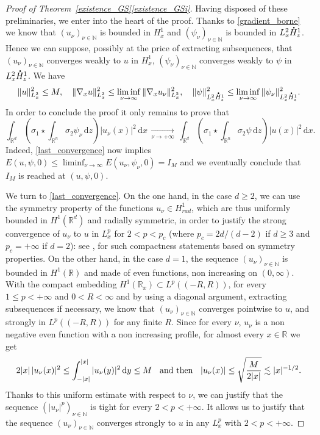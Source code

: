 \documentclass[10pt]{amsart}
\theoremstyle{definition}
\newcommand*{\overbigdot}[1]{%
\accentset{\mbox{\large\bfseries .}}{#1}}
\newenvironment{ProofOf}[1]{\begin{proof}[Proof of #1]}{\end{proof}}
\newcommand{\R}{\mathbb{R}}
\newcommand{\ud}{\, {\mathrm{d}}}
\begin{document}
\begin{ProofOf}{Theorem~\ref{existence_GS}\eqref{existence_GSi}}
Having disposed of these preliminaries, we enter into the heart of the proof. Thanks to \eqref{gradient_borne} we know that $(u_{\nu})_{\nu\in \mathbb N}$ is bounded in $H_{x}^{1}$ and $(\psi_{\nu})_{\nu\in \mathbb N}$ is bounded in $L_{x}^{2}\overbigdot{H}_{z}^{1}$. Hence we can suppose, possibly at the price of extracting subsequences, that $(u_{\nu})_{\nu\in \mathbb N}$ converges weakly to $u$ in $H_{x}^{1}$, $(\psi_{\nu})_{\nu\in \mathbb N}$ converges weakly to $\psi$ in $L_{x}^{2}\overbigdot{H}_{z}^{1}$. We have
\[
\|u\|_{L_{x}^{2}}^{2}\leq M,\quad \|\nabla_{x}u\|_{L_{x}^{2}}^{2}\leq\liminf_{\nu\to \infty}\|\nabla_{x}u_{\nu}\|_{L_{x}^{2}}^{2},\quad \|\psi\|_{L_{x}^{2}\overbigdot{H}_{z}^{1}}^{2}\leq\liminf_{\nu\to \infty}\|\psi_{\nu}\|_{L_{x}^{2}\overbigdot{H}_{z}^{1}}^{2}.
\]
In order to conclude the proof it only remains to prove that\vspace*{-3pt}
\begin{equation}\label{last_convergence}
\int_{\R^{d}}\left(\sigma_{1}\star\int_{\R^{n}}\sigma_{2}\psi_{\nu}\ud z\right)|u_{\nu}(x)|^{2}\ud x\,\underset{\nu\to +\infty}{\to}\,\int_{\R^{d}}\left(\sigma_{1}\star\int_{\R^{n}}\sigma_{2}\psi\ud z\right)|u(x)|^{2}\ud x.
\end{equation}
Indeed, \eqref{last_convergence} now implies $E(u,\psi,0)\leq\liminf_{\nu\to\infty} E(u_{\nu},\psi_{\nu},0)=I_{M}$ and we eventually conclude that $I_{M}$ is reached at $(u,\psi,0)$.

We turn to \eqref{last_convergence}. On the one hand, in the case $d\geq 2$,
we can use the symmetry property of the functions $u_{\nu}\in H_{rad}^{1}$,
which are thus uniformly bounded in $H^1(\mathbb R^d)$ and radially symmetric,
in order to justify the strong convergence of $u_{\nu}$ to $u$ in $L_{x}^{p}$ for $2<p<p_{c}$ (where $p_{c}=2d/(d-2)$ if $d\geq 3$ and $p_{c}=+\infty$ if $d=2$):
see \cite[Prop.\,1.1]{Pllsc}, \cite[Radial Lem.\,1]{Strauss} for such compactness statements based on symmetry properties. On the other hand, in the case $d=1$,
the sequence $(u_{\nu})_{\nu\in \mathbb N}$ is bounded in $H^1(\mathbb R)$
and made of even functions, non increasing on $(0,\infty)$.
With the compact embedding
$H^{1}(\R_{x})\subset L^{p}((-R,R))$, for every $1\leq p<+\infty$ and $0<R<\infty$
and by using a diagonal argument, extracting subsequences if necessary, we know that $(u_{\nu})_{\nu\in\mathbb N}$ converges pointwise to $u$, and strongly in $L^p((-R,R))$ for any finite $R$.
Since for every $\nu$, $u_{\nu}$ is a non negative even function with a non increasing profile, for almost every
$x\in\R$ we get
\[
2|x|\,|u_{\nu}(x)|^{2}\leq\int_{-|x|}^{|x|}|u_{\nu}(y)|^{2}\ud y\leq M \hspace{0.2cm}\text{ and then }\hspace{0.2cm} |u_{\nu}(x)|\leq\sqrt{\frac{M}{2|x|}}\lesssim|x|^{-1/2}.
\]
Thanks to this uniform estimate with respect to $\nu$, we can justify that the sequence $(|u_{\nu}|^{p})_{\nu\in \mathbb N}$ is tight for every $2<p<+\infty$.
It
allows us to justify that the sequence $(u_{\nu})_{\nu\in \mathbb N}$ converges strongly to $u$ in any $L_{x}^{p}$ with $2<p<+\infty$.


\end{ProofOf}
\end{document}
